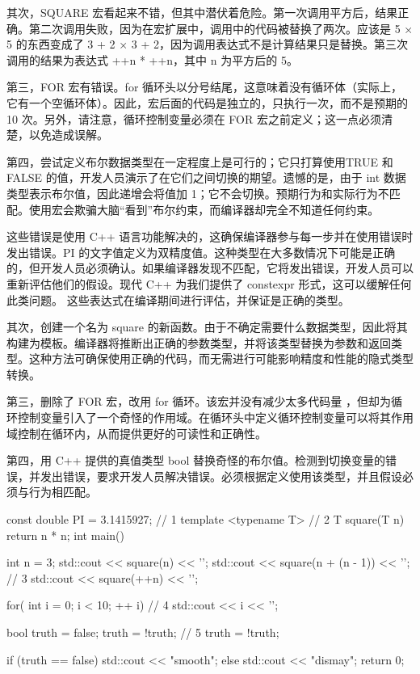 其次，SQUARE 宏看起来不错，但其中潜伏着危险。第一次调用平方后，结果正确。第二次调用失败，因为在宏扩展中，调用中的代码被替换了两次。应该是 5 × 5 的东西变成了 3 + 2 × 3 + 2，因为调用表达式不是计算结果只是替换。第三次调用的结果为表达式 ++n * ++n，其中 n 为平方后的 5。

第三，FOR 宏有错误。for 循环头以分号结尾，这意味着没有循环体（实际上，它有一个空循环体）。因此，宏后面的代码是独立的，只执行一次，而不是预期的 10 次。另外，请注意，循环控制变量必须在 FOR 宏之前定义；这一点必须清楚，以免造成误解。

第四，尝试定义布尔数据类型在一定程度上是可行的；它只打算使用TRUE 和 FALSE 的值，开发人员演示了在它们之间切换的期望。遗憾的是，由于 int 数据类型表示布尔值，因此递增会将值加 1；它不会切换。预期行为和实际行为不匹配。使用宏会欺骗大脑“看到”布尔约束，而编译器却完全不知道任何约束。


这些错误是使用 C++ 语言功能解决的，这确保编译器参与每一步并在使用错误时发出错误。PI 的文字值定义为双精度值。这种类型在大多数情况下可能是正确的，但开发人员必须确认。如果编译器发现不匹配，它将发出错误，开发人员可以重新评估他们的假设。现代 C++ 为我们提供了 constexpr 形式，这可以缓解任何此类问题。
这些表达式在编译期间进行评估，并保证是正确的类型。

其次，创建一个名为 square 的新函数。由于不确定需要什么数据类型，因此将其构建为模板。编译器将推断出正确的参数类型，并将该类型替换为参数和返回类型。这种方法可确保使用正确的代码，而无需进行可能影响精度和性能的隐式类型转换。

第三，删除了 FOR 宏，改用 for 循环。该宏并没有减少太多代码量 ，但却为循环控制变量引入了一个奇怪的作用域。在循环头中定义循环控制变量可以将其作用域控制在循环内，从而提供更好的可读性和正确性。

第四，用 C++ 提供的真值类型 bool 替换奇怪的布尔值。检测到切换变量的错误，并发出错误，要求开发人员解决错误。必须根据定义使用该类型，并且假设必须与行为相匹配。


\begin{cpp}
const double PI = 3.1415927; // 1
template <typename T> // 2
T square(T n) {
  return n * n;
}
int main() {
  int n = 3;
  std::cout << square(n) << '\n';
  std::cout << square(n + (n - 1)) << '\n'; // 3
  std::cout << square(++n) << '\n';

  for( int i = 0; i < 10; ++ i) // 4
    std::cout << i << '\n';

  bool truth = false;
  truth = !truth; // 5
  truth = !truth;

  if (truth == false)
    std::cout << "smooth\n";
  else
    std::cout << "dismay\n";
  return 0;
}
\end{cpp}


